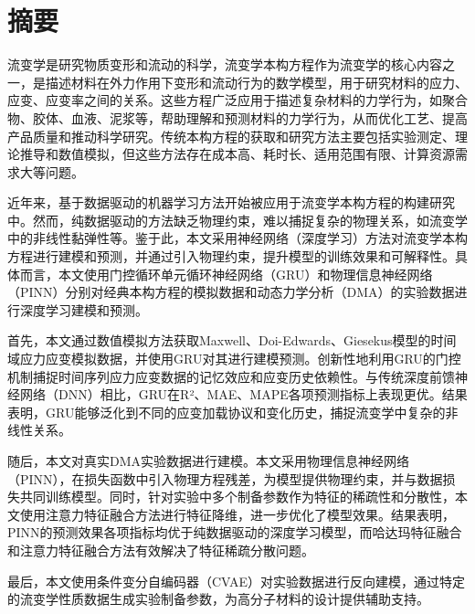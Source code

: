 \chapter{摘\texorpdfstring{\quad}{}要}
流变学是研究物质变形和流动的科学，流变学本构方程作为流变学的核心内容之一，是描述材料在外力作用下变形和流动行为的数学模型，用于研究材料的应力、应变、应变率之间的关系。这些方程广泛应用于描述复杂材料的力学行为，如聚合物、胶体、血液、泥浆等，帮助理解和预测材料的力学行为，从而优化工艺、提高产品质量和推动科学研究。传统本构方程的获取和研究方法主要包括实验测定、理论推导和数值模拟，但这些方法存在成本高、耗时长、适用范围有限、计算资源需求大等问题。

近年来，基于数据驱动的机器学习方法开始被应用于流变学本构方程的构建研究中。然而，纯数据驱动的方法缺乏物理约束，难以捕捉复杂的物理关系，如流变学中的非线性黏弹性等。鉴于此，本文采用神经网络（深度学习）方法对流变学本构方程进行建模和预测，并通过引入物理约束，提升模型的训练效果和可解释性。具体而言，本文使用门控循环单元循环神经网络（GRU）和物理信息神经网络（PINN）分别对经典本构方程的模拟数据和动态力学分析（DMA）的实验数据进行深度学习建模和预测。

首先，本文通过数值模拟方法获取Maxwell、Doi-Edwards、Giesekus模型的时间域应力应变模拟数据，并使用GRU对其进行建模预测。创新性地利用GRU的门控机制捕捉时间序列应力应变数据的记忆效应和应变历史依赖性。与传统深度前馈神经网络（DNN）相比，GRU在R²、MAE、MAPE各项预测指标上表现更优。结果表明，GRU能够泛化到不同的应变加载协议和变化历史，捕捉流变学中复杂的非线性关系。

随后，本文对真实DMA实验数据进行建模。本文采用物理信息神经网络（PINN），在损失函数中引入物理方程残差，为模型提供物理约束，并与数据损失共同训练模型。同时，针对实验中多个制备参数作为特征的稀疏性和分散性，本文使用注意力特征融合方法进行特征降维，进一步优化了模型效果。结果表明，PINN的预测效果各项指标均优于纯数据驱动的深度学习模型，而哈达玛特征融合和注意力特征融合方法有效解决了特征稀疏分散问题。

最后，本文使用条件变分自编码器（CVAE）对实验数据进行反向建模，通过特定的流变学性质数据生成实验制备参数，为高分子材料的设计提供辅助支持。

